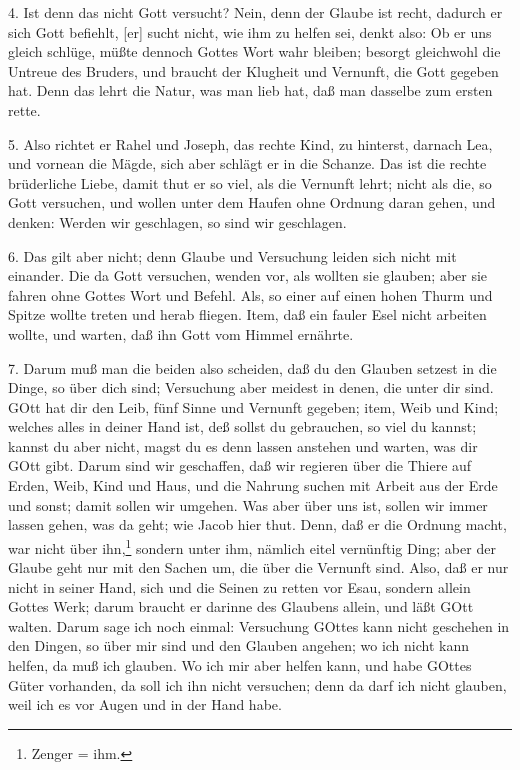 4. Ist denn das nicht Gott versucht? Nein, denn der Glaube ist recht, dadurch er sich Gott befiehlt, [er] sucht nicht, wie ihm zu helfen sei, denkt also: Ob er uns gleich schlüge, müßte dennoch Gottes Wort wahr bleiben; besorgt gleichwohl die Untreue des Bruders, und braucht der Klugheit und Vernunft, die Gott gegeben hat. Denn das lehrt die Natur, was man lieb hat, daß man dasselbe zum ersten rette.

5. Also richtet er Rahel und Joseph, das rechte Kind, zu hinterst, darnach Lea, und vornean die Mägde, sich aber schlägt er in die Schanze. Das ist die rechte brüderliche Liebe, damit thut er so viel, als die Vernunft lehrt; nicht als die, so Gott versuchen, und wollen unter dem Haufen ohne Ordnung daran gehen, und denken: Werden wir geschlagen, so sind wir geschlagen.

6. Das gilt aber nicht; denn Glaube und Versuchung leiden sich nicht mit einander. Die da Gott versuchen, wenden vor, als wollten sie glauben; aber sie fahren ohne Gottes Wort und Befehl. Als, so einer auf einen hohen Thurm und Spitze wollte treten und herab fliegen. Item, daß ein fauler Esel nicht arbeiten wollte, und warten, daß ihn Gott vom Himmel ernährte.

7. Darum muß man die beiden also scheiden, daß du den Glauben setzest in die Dinge, so über dich sind; Versuchung aber meidest in denen, die unter dir sind. GOtt hat dir den Leib, fünf Sinne und Vernunft gegeben; item, Weib und Kind; welches alles in deiner Hand ist, deß sollst du gebrauchen, so viel du kannst; kannst du aber nicht, magst du es denn lassen anstehen und warten, was dir GOtt gibt. Darum sind wir geschaffen, daß wir regieren über die Thiere auf Erden, Weib, Kind und Haus, und die Nahrung suchen mit Arbeit aus der Erde und sonst; damit sollen wir umgehen. Was aber über uns ist, sollen wir immer lassen gehen, was da geht; wie Jacob hier thut. Denn, daß er die Ordnung macht, war nicht über ihn,\footnote{Zenger = ihm.} sondern unter ihm, nämlich eitel vernünftig Ding; aber der Glaube geht nur mit den Sachen um, die über die Vernunft sind. Also, daß er nur nicht in seiner Hand, sich und die Seinen zu retten vor Esau, sondern allein Gottes Werk; darum braucht er darinne des Glaubens allein, und läßt GOtt walten. Darum sage ich noch einmal: Versuchung GOttes kann nicht geschehen in den Dingen, so über mir sind und den Glauben angehen; wo ich nicht kann helfen, da muß ich glauben. Wo ich mir aber helfen kann, und habe GOttes Güter vorhanden, da soll ich ihn nicht versuchen; denn da darf ich nicht glauben, weil ich es vor Augen und in der Hand habe.

